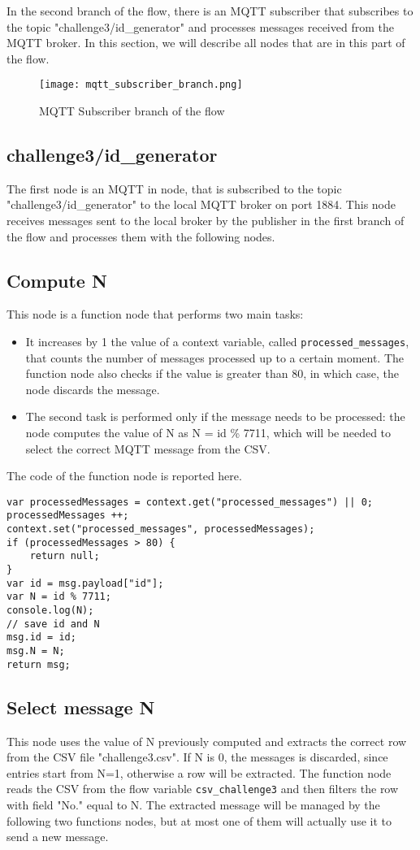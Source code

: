 In the second branch of the flow, there is an MQTT subscriber that subscribes to the topic "challenge3/id\_generator" and processes messages received from the MQTT broker. In this section, we will describe all nodes that are in this part of the flow.

\begin{figure}[H]
    \centering
    \texttt{[image: mqtt\_subscriber\_branch.png]}
    \caption{MQTT Subscriber branch of the flow}
\end{figure}

\subsection{challenge3/id\_generator}
The first node is an MQTT in node, that is subscribed to the topic "challenge3/id\_generator" to the local MQTT broker on port 1884. This node receives messages sent to the local broker by the publisher in the first branch of the flow and processes them with the following nodes.

\subsection{Compute N}
This node is a function node that performs two main tasks:
\begin{itemize}
\item It increases by 1 the value of a context variable, called \verb|processed_messages|, that counts the number of messages processed up to a certain moment. The function node also checks if the value is greater than 80, in which case, the node discards the message.
\item The second task is performed only if the message needs to be processed: the node computes the value of N as N = id \% 7711, which will be needed to select the correct MQTT message from the CSV.
\end{itemize}

The code of the function node is reported here.
\begin{verbatim}
var processedMessages = context.get("processed_messages") || 0;
processedMessages ++;
context.set("processed_messages", processedMessages);
if (processedMessages > 80) {
    return null;
}
var id = msg.payload["id"];
var N = id % 7711;
console.log(N);
// save id and N
msg.id = id;
msg.N = N;
return msg;
\end{verbatim}

\subsection{Select message N}
This node uses the value of N previously computed and extracts the correct row from the CSV file "challenge3.csv". If N is 0, the messages is discarded, since entries start from N=1, otherwise a row will be extracted. The function node reads the CSV from the flow variable \verb|csv_challenge3| and then filters the row with field "No." equal to N. The extracted message will be managed by the following two functions nodes, but at most one of them will actually use it to send a new message.

